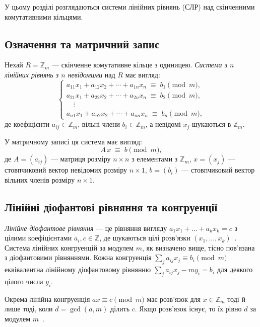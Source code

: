 У цьому розділі розглядаються системи лінійних рівнянь (СЛР) над скінченними комутативними кільцями.

\subsection{Означення та матричний запис}
\label{subsec:sle_definition}

Нехай \(R = \mathbb{Z}_m\) — скінченне комутативне кільце з одиницею.
\emph{Система з \(n\) лінійних рівнянь з \(n\) невідомими} над \(R\) має вигляд:
\[
    \begin{cases}
        a_{11}x_1 + a_{12}x_2 + \cdots + a_{1n}x_n \;\equiv\; b_1 \pmod{m},\\
        a_{21}x_1 + a_{22}x_2 + \cdots + a_{2n}x_n \;\equiv\; b_2 \pmod{m},\\
        \quad\vdots\\
        a_{n1}x_1 + a_{n2}x_2 + \cdots + a_{nn}x_n \;\equiv\; b_n \pmod{m},
    \end{cases}
\]
де коефіцієнти \(a_{ij} \in \mathbb{Z}_m\), вільні члени \(b_i \in \mathbb{Z}_m\), а невідомі \(x_j\) шукаються в \(\mathbb{Z}_m\).

У матричному записі ця система має вигляд:
\[
    A\,x \;\equiv\; b \pmod{m},
\]
де \(A = (a_{ij})\) — матриця розміру \(n\times n\) з елементами з \(\mathbb{Z}_m\), \(x = (x_j)\) — стовпчиковий вектор невідомих розміру \(n\times 1\), \(b = (b_i)\) — стовпчиковий вектор вільних членів розміру \(n\times 1\).

\subsection{Лінійні діофантові рівняння та конгруенції}
\label{subsec:diophantine}

\emph{Лінійне діофантове рівняння} — це рівняння вигляду \(a_1 x_1 + \dots + a_k x_k = c\) з цілими коефіцієнтами \(a_i, c \in \mathbb{Z}\), де шукаються цілі розв’язки \((x_1,\dots,x_k)\)~\cite{2}.
Система лінійних конгруенцій за модулем \(m\), як визначено вище, тісно пов’язана з діофантовими рівняннями.
Кожна конгруенція \( \sum_j a_{ij} x_j \equiv b_i \pmod{m} \) еквівалентна лінійному діофантовому рівнянню \( \sum_j a_{ij} x_j - m y_i = b_i \) для деякого цілого числа \(y_i\).

Окрема лінійна конгруенція \(a x \equiv c \pmod{m}\) має розв’язок для \(x \in \mathbb{Z}_m\) тоді й лише тоді, коли \(d = \gcd(a,m)\) ділить \(c\).
Якщо розв’язок існує, то їх рівно \(d\) за модулем \(m\)~\cite{7}.


